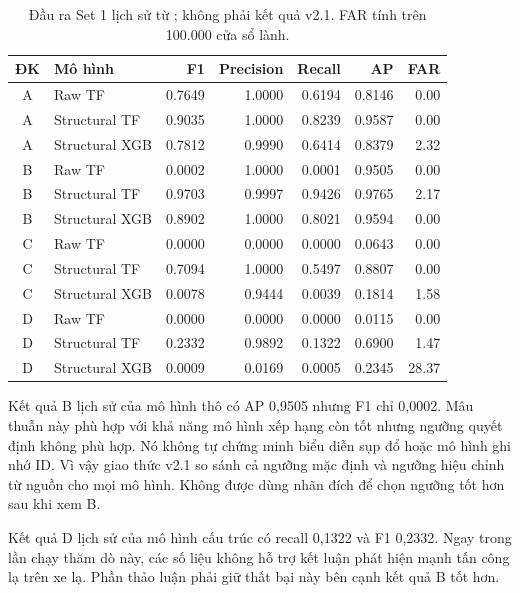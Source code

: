 \documentclass[12pt,a4paper,oneside,openany]{extbook}
\DeclareRobustCommand{\code}[1]{\texttt{\detokenize{#1}}}
\begin{document}
\begin{table}[htbp]\centering\small
\caption{Đầu ra Set 1 lịch sử từ \code{phase3_method_comparison.csv}; không phải kết quả v2.1. FAR tính trên 100.000 cửa sổ lành.}\label{tab:historical}
\begin{tabular}{clrrrrr}\toprule
ĐK & Mô hình & F1 & Precision & Recall & AP & FAR\\\midrule

A & Raw TF & 0.7649 & 1.0000 & 0.6194 & 0.8146 & 0.00 \\
A & Structural TF & 0.9035 & 1.0000 & 0.8239 & 0.9587 & 0.00 \\
A & Structural XGB & 0.7812 & 0.9990 & 0.6414 & 0.8379 & 2.32 \\
B & Raw TF & 0.0002 & 1.0000 & 0.0001 & 0.9505 & 0.00 \\
B & Structural TF & 0.9703 & 0.9997 & 0.9426 & 0.9765 & 2.17 \\
B & Structural XGB & 0.8902 & 1.0000 & 0.8021 & 0.9594 & 0.00 \\
C & Raw TF & 0.0000 & 0.0000 & 0.0000 & 0.0643 & 0.00 \\
C & Structural TF & 0.7094 & 1.0000 & 0.5497 & 0.8807 & 0.00 \\
C & Structural XGB & 0.0078 & 0.9444 & 0.0039 & 0.1814 & 1.58 \\
D & Raw TF & 0.0000 & 0.0000 & 0.0000 & 0.0115 & 0.00 \\
D & Structural TF & 0.2332 & 0.9892 & 0.1322 & 0.6900 & 1.47 \\
D & Structural XGB & 0.0009 & 0.0169 & 0.0005 & 0.2345 & 28.37 \\
\bottomrule
\end{tabular}
\end{table}

Kết quả B lịch sử của mô hình thô có AP 0,9505 nhưng F1 chỉ 0,0002. Mâu thuẫn này phù hợp với khả năng mô hình xếp hạng còn tốt nhưng ngưỡng quyết định không phù hợp. Nó không tự chứng minh biểu diễn sụp đổ hoặc mô hình ghi nhớ ID. Vì vậy giao thức v2.1 so sánh cả ngưỡng mặc định và ngưỡng hiệu chỉnh từ nguồn cho mọi mô hình. Không được dùng nhãn đích để chọn ngưỡng tốt hơn sau khi xem B.

Kết quả D lịch sử của mô hình cấu trúc có recall 0,1322 và F1 0,2332. Ngay trong lần chạy thăm dò này, các số liệu không hỗ trợ kết luận phát hiện mạnh tấn công lạ trên xe lạ. Phần thảo luận phải giữ thất bại này bên cạnh kết quả B tốt hơn.
\end{document}

